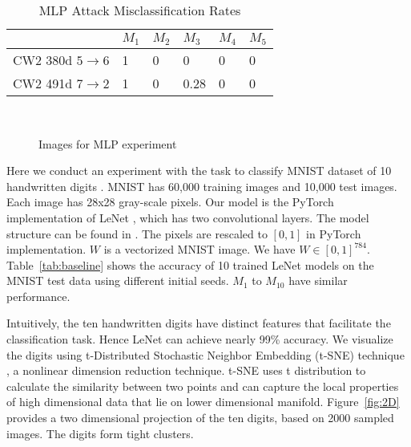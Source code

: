 \documentclass[12pt]{article}
\begin{document}
%
\begin{table}[b]
\caption{MLP Attack Misclassification Rates}
\label{tab:cw2-misrate-MLP}
\begin{center}
{\footnotesize 
\begin{tabular}{|l|lllll|} \hline
   &$M_1$&$M_2$&$M_3$&$M_4$&$M_5$\\\hline
CW2 380d $5\to 6$& 1 & 0 & 0 & 0 & 0  \\
CW2 491d $7\to 2$& 1 & 0 & 0.28 & 0 & 0  \\
\hline
\end{tabular} }
\end{center}
\end{table}

%
\begin{figure}[t]
\centering
{}
\centering
{}
\centering
{}
\\
\centering
{}
\centering
{}
\centering
{}
\caption{Images for MLP experiment}
\label{fig:MLP-images}
\end{figure}



Here we conduct an experiment with the task to
classify MNIST dataset of 10 handwritten digits \cite{mnist}. MNIST has
60,000 training 
images and 10,000 test images. Each image has 28x28 gray-scale
pixels. Our model is the PyTorch implementation of LeNet
\cite{lenet1998}, which has
two convolutional layers. The model structure can be found in \cite{pytorch-lenet-fgsm,pytorch-lenet-tutorial}. The pixels are rescaled to
$[0,1]$ in PyTorch implementation. $W$ is a vectorized MNIST
image. We have $W \in [0,1]^{784}$. Table~\ref{tab:baseline} shows the
accuracy of 10 trained LeNet models on the MNIST test data using
different initial  seeds.  $M_1$ to
$M_{10}$ have similar performance.   

Intuitively, the ten handwritten digits have distinct features that
facilitate the classification task. Hence LeNet can achieve nearly 99\%
accuracy. We visualize the digits 
using t-Distributed Stochastic Neighbor Embedding (t-SNE) technique
\cite{tSNE-dimreduction-2008}, a nonlinear dimension reduction
technique. t-SNE uses t distribution to 
calculate the similarity between two points and can capture the local
properties of high dimensional data that lie on lower dimensional
manifold. Figure~\ref{fig:2D} provides a two dimensional projection of
the ten digits, based on 2000 sampled images. The digits form tight clusters.
\end{document}
